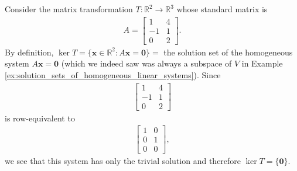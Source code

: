 \documentclass[12pt,letterpaper,reqno]{article}
\numberwithin{equation}{section}
\newcommand{\R}{\ensuremath{\mathbb R}}
\begin{document}
\begin{example}
Consider the matrix transformation $T:\R^2 \to \R^3$ whose standard matrix is 
\begin{align*}
	A=\begin{bmatrix}
		1 & 4 \\
		-1 & 1 \\
		 0 & 2		
	\end{bmatrix}.
\end{align*}	
By definition, $\ker T=\{\mathbf{x} \in \R^2:A\mathbf{x}=\mathbf{0}\}=$ the solution set of the homogeneous system $A\mathbf{x}=\mathbf{0}$ (which we indeed saw was always a subspace of $V$ in Example \ref{ex:solution_sets_of_homogeneous_linear_systems}). Since 
\begin{align*}
	\begin{bmatrix}
		1 & 4 \\ 
		-1 & 1 \\
		0 & 2
	\end{bmatrix}
\end{align*}
is row-equivalent to
\begin{align*}
	\begin{bmatrix}
		1 & 0 \\
		0 & 1 \\
		0 & 0
	\end{bmatrix},
\end{align*}
we see that this system has only the trivial solution and therefore $\ker T=\{\mathbf{0}\}$.


\end{example}
\end{document}
